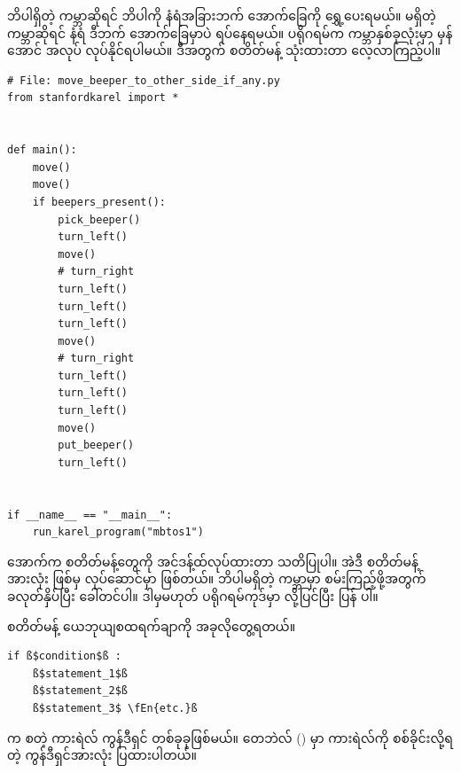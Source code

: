 %
ဘိပါရှိတဲ့ ကမ္ဘာဆိုရင် ဘိပါကို နံရံအခြားဘက် အောက်ခြေကို ရွှေ့ပေးရမယ်။ မရှိတဲ့ကမ္ဘာဆိုရင် နံရံ ဒီဘက် အောက်ခြေမှာပဲ ရပ်နေရမယ်။ ပရိုဂရမ်က ကမ္ဘာနှစ်ခုလုံးမှာ မှန်အောင် အလုပ် လုပ်နိုင်ရပါမယ်။ ဒီအတွက်  စတိတ်မန့် သုံးထားတာ လေ့လာကြည့်ပါ။ 
%
\setlength{\fboxsep}{0pt}
\begin{verbatim}
# File: move_beeper_to_other_side_if_any.py
from stanfordkarel import *


def main():
    move()
    move()
    if beepers_present():
        pick_beeper()
        turn_left()
        move()
        # turn_right
        turn_left()
        turn_left()
        turn_left()
        move()
        # turn_right
        turn_left()
        turn_left()
        turn_left()
        move()
        put_beeper()
        turn_left()


if __name__ == "__main__":
    run_karel_program("mbtos1")

\end{verbatim}
%
 အောက်က စတိတ်မန့်တွေကို အင်ဒန့်ထ်လုပ်ထားတာ သတိပြုပါ။ အဲဒီ စတိတ်မန့်အားလုံး  ဖြစ်မှ လုပ်ဆောင်မှာ ဖြစ်တယ်။ ဘိပါမရှိတဲ့ ကမ္ဘာမှာ စမ်းကြည့်ဖို့အတွက်  ခလုတ်နှိပ်ပြီး ခေါ်တင်ပါ။  ဒါမှမဟုတ် ပရိုဂရမ်ကုဒ်မှာ  လို့ပြင်ပြီး ပြန်  ပါ။  

 စတိတ်မန့် ယေဘုယျစထရက်ချာကို အခုလိုတွေ့ရတယ်။
%
\setlength{\fboxsep}{0pt}
\begin{verbatim}
if ß$condition$ß :
    ß$statement_1$ß
    ß$statement_2$ß
    ß$statement_3$ \fEn{etc.}ß
\end{verbatim}
%
 က \fEn{,}  စတဲ့ ကားရဲလ် ကွန်ဒီရှင် တစ်ခုခုဖြစ်မယ်။ တေဘဲလ် (\fRefNo{\ref{tbl:karel_conditions}}) မှာ ကားရဲလ်ကို စစ်ခိုင်းလို့ရတဲ့ ကွန်ဒီရှင်အားလုံး ပြထားပါတယ်။


